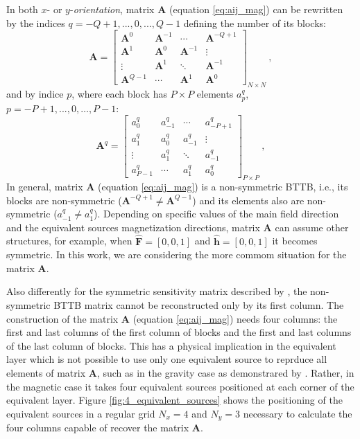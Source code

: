 In both $x$- or $y$-\textit{orientation}, matrix $\mathbf{A}$ (equation \ref{eq:aij_mag}) can be rewritten by the indices $q = -Q + 1,...,0,..., Q-1$ defining the number of its blocks:
\begin{equation}
\mathbf{A} = \begin{bmatrix}
\mathbf{A}^{0}   & \mathbf{A}^{-1} & \cdots          & \mathbf{A}^{-Q+1} \\
\mathbf{A}^{1}   & \mathbf{A}^{0}  & \mathbf{A}^{-1} & \vdots           \\ 
\vdots           & \mathbf{A}^{1}  & \ddots          & \mathbf{A}^{-1}   \\
\mathbf{A}^{Q-1} & \cdots          & \mathbf{A}^{1}  & \mathbf{A}^{0}                 
\end{bmatrix}_{N \times N} \: ,
\label{eq:BTTB_A}
\end{equation}
and by indice $p$, where each block has $P \times P$ elements $a^{q}_{p}$, $p = -P + 1,..., 0, \dots, P - 1$:
\begin{equation}
\mathbf{A}^{q} = \begin{bmatrix}
a^{q}_{0}   & a^{q}_{-1} & \cdots     & a^{q}_{-P+1} \\
a^{q}_{1}   & a^{q}_{0}  & a^{q}_{-1} & \vdots           \\ 
\vdots      & a^{q}_{1}  & \ddots     & a^{q}_{-1}   \\
a^{q}_{P-1} & \cdots     & a^{q}_{1}  & a^{q}_{0}                 
\end{bmatrix}_{P \times P} \: ,
\label{eq:Aq_block}
\end{equation}
In general, matrix $\mathbf{A}$ (equation \ref{eq:aij_mag}) is a non-symmetric BTTB, i.e., its blocks are non-symmetric ($\mathbf{A}^{-Q+1} \neq \mathbf{A}^{Q-1} $) and its elements also are non-symmetric ($a^{q}_{-1} \neq a^{q}_{1}$). Depending on specific values of the main field direction and the equivalent sources magnetization directions, matrix $\mathbf{A}$ can assume other structures, for example, when $\hat{\mathbf{F}} = [0, 0, 1]$ and $\hat{\mathbf{h}} = [0, 0, 1]$ it becomes symmetric. In this work, we are considering the more commom situation for the matrix $\mathbf{A}$.

Also differently for the symmetric sensitivity matrix described by \cite{takahashi2020convolutional}, the non-symmetric BTTB matrix cannot be reconstructed only by its first column. The construction of the matrix $\mathbf{A}$ (equation \ref{eq:aij_mag}) needs four columns: the first and last columns of the first column of blocks and the first and last columns of the last column of blocks. This has a physical implication in the equivalent layer which is not possible to use only one equivalent source to reprduce all elements of matrix $\mathbf{A}$, such as in the gravity case as demonstrared by \cite{takahashi2020convolutional}. Rather, in the magnetic case it takes four equivalent sources positioned at each corner of the equivalent layer. Figure \ref{fig:4_equivalent_sources} shows the positioning of the equivalent sources in a regular grid $N_x = 4$
and $N_y = 3$ necessary to calculate the four columns capable of recover the matrix $\mathbf{A}$.

